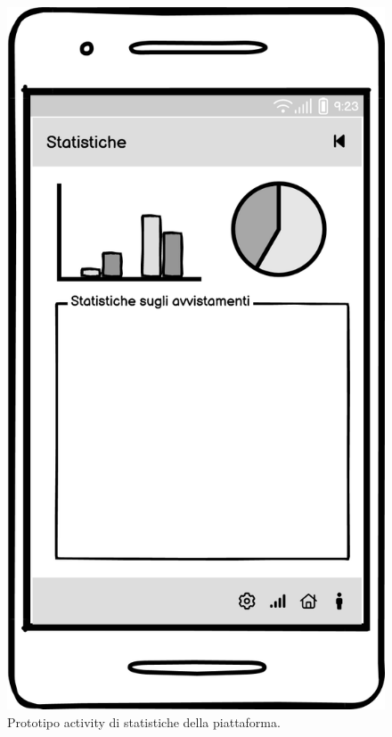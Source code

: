 \documentclass[a4paper,final,12pt]{report}
\begin{document}
\begin{figure}[hbtp]
\centering
\includegraphics[scale=0.50]{img_concettuale/stat_mob.png}
\caption{Prototipo activity di statistiche della piattaforma.}
\label{figura:protstatapiat}
\end{figure}
\end{document}
